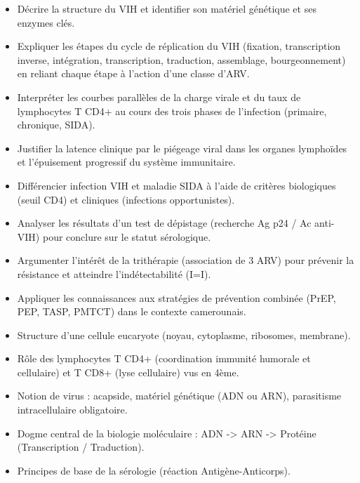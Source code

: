 \documentclass[11pt]{article}
\begin{document}
\begin{objectifs}
\begin{itemize}
\item Décrire la structure du VIH et identifier son matériel génétique et ses enzymes clés.
\item Expliquer les étapes du cycle de réplication du VIH (fixation, transcription inverse, intégration, transcription, traduction, assemblage, bourgeonnement) en reliant chaque étape à l'action d'une classe d'ARV.
\item Interpréter les courbes parallèles de la charge virale et du taux de lymphocytes T CD4+ au cours des trois phases de l'infection (primaire, chronique, SIDA).
\item Justifier la latence clinique par le piégeage viral dans les organes lymphoïdes et l'épuisement progressif du système immunitaire.
\item Différencier infection VIH et maladie SIDA à l'aide de critères biologiques (seuil CD4) et cliniques (infections opportunistes).
\item Analyser les résultats d'un test de dépistage (recherche Ag p24 / Ac anti-VIH) pour conclure sur le statut sérologique.
\item Argumenter l'intérêt de la trithérapie (association de 3 ARV) pour prévenir la résistance et atteindre l'indétectabilité (I=I).
\item Appliquer les connaissances aux stratégies de prévention combinée (PrEP, PEP, TASP, PMTCT) dans le contexte camerounais.
\end{itemize}
\end{objectifs}

\begin{prerequis}
\begin{itemize}
\item Structure d'une cellule eucaryote (noyau, cytoplasme, ribosomes, membrane).
\item Rôle des lymphocytes T CD4+ (coordination immunité humorale et cellulaire) et T CD8+ (lyse cellulaire) vus en 4ème.
\item Notion de virus : acapside, matériel génétique (ADN ou ARN), parasitisme intracellulaire obligatoire.
\item Dogme central de la biologie moléculaire : ADN -> ARN -> Protéine (Transcription / Traduction).
\item Principes de base de la sérologie (réaction Antigène-Anticorps).
\end{itemize}
\end{prerequis}
\end{document}
